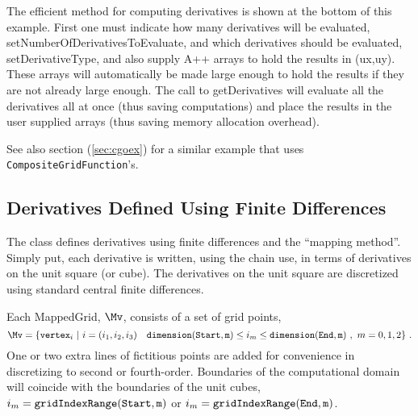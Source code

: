 The efficient method for computing derivatives is shown at the bottom
of this example. First one must indicate how many derivatives
will be evaluated, {\ff setNumberOfDerivativesToEvaluate},
and which derivatives should be
evaluated, {\ff setDerivativeType}, 
and also supply A++ arrays to hold the results in ({\ff ux,uy}).
 These
arrays will automatically be made large enough to hold the results
if they are not already large enough.
The call to
{\ff getDerivatives} will evaluate all the derivatives all at once (thus
saving computations) and place the results in the user supplied arrays
(thus saving memory allocation overhead). 

See also section (\ref{sec:cgoex}) for a similar example that uses
{\tt CompositeGridFunction}'s.


\subsection{Derivatives Defined Using Finite Differences}

The class {\ff \MGO} defines derivatives using finite differences
and the ``mapping method''. Simply put, each derivative
is written, using the chain use, in terms of derivatives on
the unit square (or cube). The derivatives on the unit
square are discretized using standard central finite
differences. 

\newcommand{\uvr}{{\partial \uv \over \partial r}}
\newcommand{\uvs}{{\partial \uv \over \partial s}}
\newcommand{\uvx}{{\partial \uv \over \partial x}}
\newcommand{\uvy}{{\partial \uv \over \partial y}}
\newcommand{\rx}{{\partial r \over \partial x}}
\newcommand{\ry}{{\partial r \over \partial y}}
\newcommand{\sx}{{\partial s \over \partial x}}
\newcommand{\sy}{{\partial s \over \partial y}}

Each {\ff MappedGrid}, $\Mv$, consists of a set of grid points,
\def\nak {\nv_{a,k}}
\def\nbk {\nv_{b,k}}
$$
\Mv  =  \{ {\ff vertex}_{i} ~|~ i=(i_1,i_2,i_3)~~~
           {\ff dimension(Start,m)} \le i_m \le {\ff dimension(End,m)} ~,~ m=0,1,2 \}    ~.
$$
One or
two extra lines of fictitious points are added for convenience
in discretizing to second or  fourth-order.
Boundaries of the computational domain will coincide
with the boundaries of the unit cubes, $i_m={\tt gridIndexRange(Start,m)}$ or
$i_m={\tt gridIndexRange(End,m)}$.

